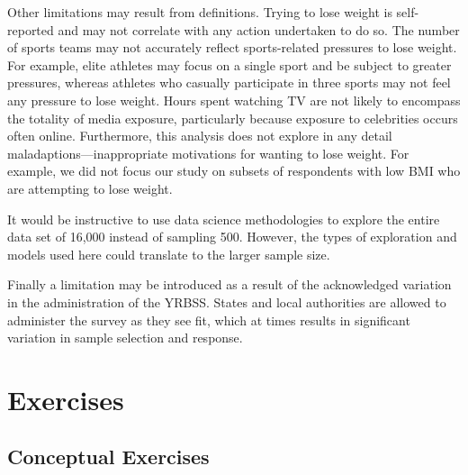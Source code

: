 \documentclass[
]{krantz}
\begin{document}
Other limitations may result from definitions. Trying to lose weight is self-reported and may not correlate with any action undertaken to do so. The number of sports teams may not accurately reflect sports-related pressures to lose weight. For example, elite athletes may focus on a single sport and be subject to greater pressures, whereas athletes who casually participate in three sports may not feel any pressure to lose weight. Hours spent watching TV are not likely to encompass the totality of media exposure, particularly because exposure to celebrities occurs often online. Furthermore, this analysis does not explore in any detail maladaptions---inappropriate motivations for wanting to lose weight. For example, we did not focus our study on subsets of respondents with low BMI who are attempting to lose weight.

It would be instructive to use data science methodologies to explore the entire data set of 16,000 instead of sampling 500. However, the types of exploration and models used here could translate to the larger sample size.

Finally a limitation may be introduced as a result of the acknowledged variation in the administration of the YRBSS. States and local authorities are allowed to administer the survey as they see fit, which at times results in significant variation in sample selection and response.

\hypertarget{exercises-5}{%
\section{Exercises}\label{exercises-5}}

\hypertarget{conceptual-exercises-3}{%
\subsection{Conceptual Exercises}\label{conceptual-exercises-3}}
\end{document}
